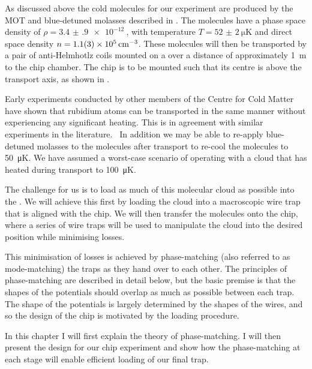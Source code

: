 As discussed above  the cold \CaF{} molecules for our experiment
are produced by the MOT and blue-detuned molasses described in
. The molecules have a phase space density of
$\rho=\SI{3.4(9)e-12}{}$, with temperature $T=\SI{52(2)}{\micro\kelvin}$ and
direct space density $n=\SI{1.1(3)E5}{\per\centi\meter\cubed}$. These molecules
will then be transported by a pair of anti-Helmhotlz coils mounted on a
 over a distance of approximately \SI{1}{\meter} to the chip chamber.
The chip is to be mounted such that its centre is 
above the transport axis, as shown in .

Early experiments conducted by other members of the Centre for Cold Matter have
shown that rubidium atoms can be transported in the same manner without
experiencing any significant heating. This is in agreement with similar
experiments in the literature.~\cite{} In addition we may be able to re-apply
blue-detuned molasses to the molecules after transport to re-cool the molecules
to \SI{50}{\micro\kelvin}. We have assumed a worst-case scenario of operating
with a cloud that has heated during transport to \SI{100}{\micro\kelvin}.

The challenge for us is to load as much of this molecular cloud as possible
into the . We will achieve this
first by loading the cloud into a macroscopic wire trap that is aligned with
the chip. We will then transfer the molecules onto the chip, where a series of
wire traps will be used to manipulate the cloud into the desired position
while minimising losses.

This minimisation of losses is achieved by phase-matching (also referred to as
mode-matching) the traps as they hand over to each other. The principles of
phase-matching are described in detail below, but the basic premise is that the
shapes of the potentials should overlap as much as possible between each trap.
The shape of the potentials is largely determined by the shapes of the wires,
and so the design of the chip is motivated by the loading procedure.

In this chapter I will first explain the theory of phase-matching. I will then
present the design for our chip experiment and show how the phase-matching at
each stage will enable efficient loading of our final trap.

